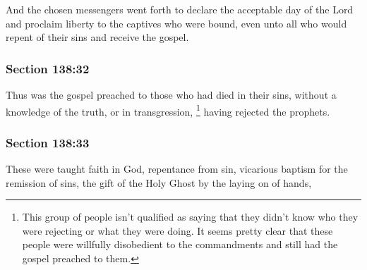 		And the chosen messengers went forth to declare the acceptable day of the Lord and proclaim liberty to the captives who were bound, even unto all who would repent of their sins and receive the gospel.


	\subsubsection{Section 138:32} %
		\label{DC138-32}

		Thus was the gospel preached to those who had died in their sins, without a knowledge of the truth, or in transgression,%
			\footnote{%
				This group of people isn't qualified as saying that they didn't know who they were rejecting or what they were doing. It seems pretty clear that these people were willfully disobedient to the commandments and still had the gospel preached to them.
				}
		having rejected the prophets.


	\subsubsection{Section 138:33} %
		\label{DC138-33}

		These were taught faith in God, repentance from sin, vicarious baptism for the remission of sins, the gift of the Holy Ghost by the laying on of hands,


